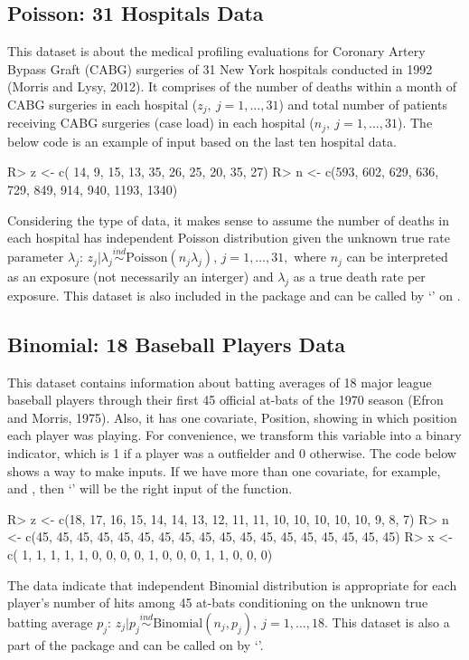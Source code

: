 \documentclass[article]{jss}
\begin{document}
\subsection{Poisson: 31 Hospitals Data}
This dataset is about the medical profiling evaluations for Coronary Artery Bypass Graft (CABG) surgeries of 31 New York hospitals conducted in 1992 (Morris and Lysy, 2012). It comprises of the number of deaths within a month of CABG surgeries in each hospital ($z_{j},~j=1, \ldots, 31$) and total number of patients receiving CABG surgeries (case load) in each hospital ($n_{j},~j=1, \ldots, 31$). The below code is an example of input based on the last ten hospital data.
\begin{CodeChunk}
\begin{CodeInput}
R> z <- c( 14,   9,  15,  13,  35,  26,  25,  20,   35,   27)
R> n <- c(593, 602, 629, 636, 729, 849, 914, 940, 1193, 1340)
\end{CodeInput}
\end{CodeChunk}


Considering the type of data, it makes sense to assume the number of deaths in each hospital has independent Poisson distribution given the unknown true rate parameter $\lambda_{j}$: $z_{j}\vert \lambda_{j}\stackrel{ind}{\sim} \textrm{Poisson}(n_{j}\lambda_{j})$, $j=1, \ldots, 31,$ where $n_{j}$ can be interpreted as an exposure (not necessarily an interger) and $\lambda_{j}$ as a true death rate per exposure. This dataset is also included in the package and can be called by `' on .

\subsection{Binomial: 18 Baseball Players Data}
This dataset contains information about batting averages of 18 major league baseball players through their first 45 official at-bats of the 1970 season (Efron and Morris, 1975). Also, it has one covariate, Position, showing in which position each player was playing. For convenience, we transform this variable into a binary indicator, which is 1 if a player was a outfielder and 0 otherwise. The code below shows a way to make inputs. If we have more than one covariate, for example,  and , then `' will be the right input of the  function.
\begin{CodeChunk}
\begin{CodeInput}
R> z <- c(18, 17, 16, 15, 14, 14, 13, 12, 11, 11, 10, 10, 10, 10, 10,  9,  8,  7)
R> n <- c(45, 45, 45, 45, 45, 45, 45, 45, 45, 45, 45, 45, 45, 45, 45, 45, 45, 45)
R> x <- c( 1,  1,  1,  1,  1,  0,  0,  0,  0,  1,  0,  0,  0,  1,  1,  0,  0,  0) 
\end{CodeInput}
\end{CodeChunk}
The data indicate that independent Binomial distribution is appropriate for each player's number of hits among 45 at-bats conditioning on the unknown true batting average $p_{j}$: $z_{j}\vert p_{j}\stackrel{ind}{\sim} \textrm{Binomial}(n_{j}, p_{j}), ~j=1, \ldots, 18$. This dataset is also a part of the package and can be called on  by `'.
\end{document}
